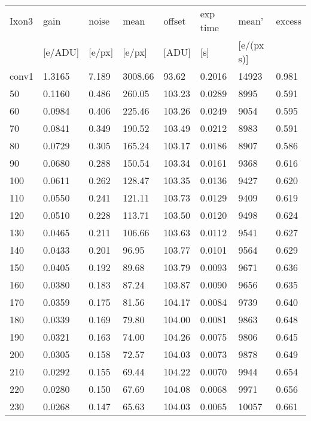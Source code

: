 \begin{table}[!htbp]
  \centering
  \begin{tabular}{|l|l|l|l|l|l|l|l|}
\hline
\textsf{Ixon3} & \textsf{gain} & \textsf{noise} & \textsf{mean} & \textsf{offset} & \textsf{exp time} & \textsf{mean'} & \textsf{excess} \\
 & [e/ADU] & [e/px] & [e/px] & [ADU] & [s] & [e/(px s)] & \\
\hline
conv1 & 1.3165 & 7.189 & 3008.66 & 93.62 & 0.2016 & 14923 & 0.981 \\
\hline
50 & 0.1160 & 0.486 & 260.05 & 103.23 & 0.0289 & 8995 & 0.591 \\
\hline
60 & 0.0984 & 0.406 & 225.46 & 103.26 & 0.0249 & 9054 & 0.595 \\
\hline
70 & 0.0841 & 0.349 & 190.52 & 103.49 & 0.0212 & 8983 & 0.591 \\
\hline
80 & 0.0729 & 0.305 & 165.24 & 103.17 & 0.0186 & 8907 & 0.586 \\
\hline
90 & 0.0680 & 0.288 & 150.54 & 103.34 & 0.0161 & 9368 & 0.616 \\
\hline
100 & 0.0611 & 0.262 & 128.47 & 103.35 & 0.0136 & 9427 & 0.620 \\
\hline
110 & 0.0550 & 0.241 & 121.11 & 103.73 & 0.0129 & 9409 & 0.619 \\
\hline
120 & 0.0510 & 0.228 & 113.71 & 103.50 & 0.0120 & 9498 & 0.624 \\
\hline
130 & 0.0465 & 0.211 & 106.66 & 103.63 & 0.0112 & 9541 & 0.627 \\
\hline
140 & 0.0433 & 0.201 & 96.95 & 103.77 & 0.0101 & 9564 & 0.629 \\
\hline
150 & 0.0405 & 0.192 & 89.68 & 103.79 & 0.0093 & 9671 & 0.636 \\
\hline
160 & 0.0380 & 0.183 & 87.24 & 103.87 & 0.0090 & 9656 & 0.635 \\
\hline
170 & 0.0359 & 0.175 & 81.56 & 104.17 & 0.0084 & 9739 & 0.640 \\
\hline
180 & 0.0339 & 0.169 & 79.80 & 104.00 & 0.0081 & 9863 & 0.648 \\
\hline
190 & 0.0321 & 0.163 & 74.00 & 104.26 & 0.0075 & 9806 & 0.645 \\
\hline
200 & 0.0305 & 0.158 & 72.57 & 104.03 & 0.0073 & 9878 & 0.649 \\
\hline
210 & 0.0292 & 0.155 & 69.44 & 104.22 & 0.0070 & 9944 & 0.654 \\
\hline
220 & 0.0280 & 0.150 & 67.69 & 104.08 & 0.0068 & 9971 & 0.656 \\
\hline
230 & 0.0268 & 0.147 & 65.63 & 104.03 & 0.0065 & 10057 & 0.661 \\

\end{tabular}
\end{table}

